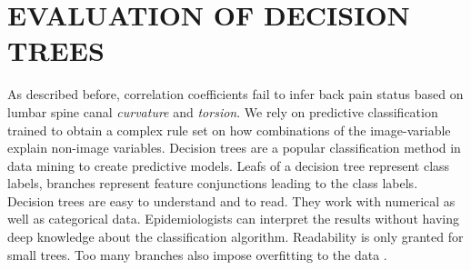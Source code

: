\documentclass[a4paper,twoside]{style/article}
\newcommand{\com}[1]{\textcolor{orange}{\uline{#1}}}
\begin{document}
%


\section{\uppercase{Evaluation of Decision Trees}}
\label{sec:DecisionTrees}
\noindent As described before, correlation coefficients fail to infer back pain status based on lumbar spine canal \emph{curvature} and \emph{torsion}.
We rely on predictive classification trained to obtain a complex rule set on how combinations of the image-variable explain non-image variables.
Decision trees are a popular classification method in data mining to create predictive models.
Leafs of a decision tree represent class labels, branches represent feature conjunctions leading to the class labels.
Decision trees are easy to understand and to read.
They work with numerical as well as categorical data.
Epidemiologists can interpret the results without having deep knowledge about the classification algorithm.
Readability is only granted for small trees. %
Too many branches also impose overfitting to the data \cite{DecisionTree}.
\end{document}
